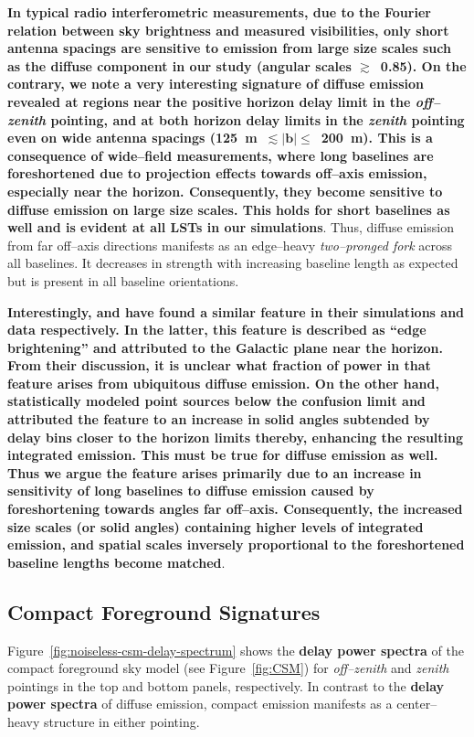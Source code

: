 \documentclass[preprint2,iop,numberedappendix]{emulateapj}
\begin{document}
{\bf In typical radio interferometric measurements, due to the Fourier relation between sky brightness and measured visibilities, only short antenna spacings are sensitive to emission from large size scales such as the diffuse component in our study (angular scales $\gtrsim$~0.85\arcdeg). On the contrary, we note a very interesting signature of diffuse emission revealed at regions near the positive horizon delay limit in the {\it off--zenith} pointing, and at both horizon delay limits in the {\it zenith} pointing even on wide antenna spacings (125~m~$\lesssim |\boldsymbol{b}|\le$~200~m). This is a consequence of wide--field measurements, where long baselines are foreshortened due to projection effects towards off--axis emission, especially near the horizon. Consequently, they become sensitive to diffuse emission on large size scales. This holds for short baselines as well and is evident at all LSTs in our simulations}. Thus, diffuse emission from far off--axis directions manifests as an edge--heavy {\it two--pronged fork} across all baselines. It decreases in strength with increasing baseline length as expected but is present in all baseline orientations.   

{\bf Interestingly, \citet{thy13} and \citet{pob13} have found a similar feature in their simulations and data respectively. In the latter, this feature is described as ``edge brightening'' and attributed to the Galactic plane near the horizon. From their discussion, it is unclear what fraction of power in that feature arises from ubiquitous diffuse emission. On the other hand, \citet{thy13} statistically modeled point sources below the confusion limit and attributed the feature to an increase in solid angles subtended by delay bins closer to the horizon limits thereby, enhancing the resulting integrated emission. This must be true for diffuse emission as well. Thus we argue the feature arises primarily due to an increase in sensitivity of long baselines to diffuse emission caused by foreshortening towards angles far off--axis. Consequently, the increased size scales (or solid angles) containing higher levels of integrated emission, and spatial scales inversely proportional to the foreshortened baseline lengths become matched}. 

\subsection{Compact Foreground Signatures}\label{sec:compact}

Figure~\ref{fig:noiseless-csm-delay-spectrum} shows the {\bf delay power spectra} of the compact foreground sky model (see Figure~\ref{fig:CSM}) for {\it off--zenith} and {\it zenith} pointings in the top and bottom panels, respectively. In contrast to the {\bf delay power spectra} of diffuse emission, compact emission manifests as a center--heavy structure in either pointing. 
\end{document}
